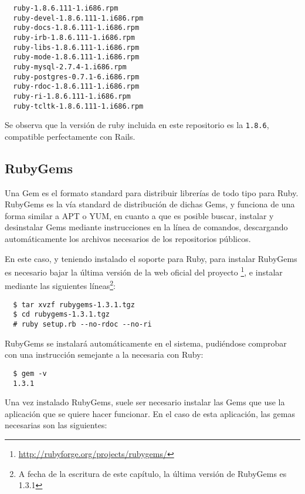 \begin{verbatim}
  ruby-1.8.6.111-1.i686.rpm
  ruby-devel-1.8.6.111-1.i686.rpm
  ruby-docs-1.8.6.111-1.i686.rpm
  ruby-irb-1.8.6.111-1.i686.rpm
  ruby-libs-1.8.6.111-1.i686.rpm
  ruby-mode-1.8.6.111-1.i686.rpm
  ruby-mysql-2.7.4-1.i686.rpm
  ruby-postgres-0.7.1-6.i686.rpm
  ruby-rdoc-1.8.6.111-1.i686.rpm
  ruby-ri-1.8.6.111-1.i686.rpm
  ruby-tcltk-1.8.6.111-1.i686.rpm
\end{verbatim}

Se observa que la versión de ruby incluida en este repositorio es la \texttt{1.8.6}, compatible perfectamente con Rails.



\subsection{RubyGems} %
\label{sub:rubygems}

Una Gem es el formato standard para distribuir librerías de todo tipo para Ruby. RubyGems es la vía standard de distribución de dichas Gems, y funciona de una forma similar a APT o YUM, en cuanto a que es posible buscar, instalar y desinstalar Gems mediante instrucciones en la línea de comandos, descargando automáticamente los archivos necesarios de los repositorios públicos.

En este caso, y teniendo instalado el soporte para Ruby, para instalar RubyGems es necesario bajar la última versión de la web oficial del proyecto \footnote{\url{http://rubyforge.org/projects/rubygems/}}, e instalar mediante las siguientes líneas\footnote{A fecha de la escritura de este capítulo, la última versión de RubyGems es 1.3.1}:

\begin{verbatim}
  $ tar xvzf rubygems-1.3.1.tgz
  $ cd rubygems-1.3.1.tgz
  # ruby setup.rb --no-rdoc --no-ri
\end{verbatim}

RubyGems se instalará automáticamente en el sistema, pudiéndose comprobar con una instrucción semejante a la necesaria con Ruby:

\begin{verbatim}
  $ gem -v
  1.3.1
\end{verbatim}

Una vez instalado RubyGems, suele ser necesario instalar las Gems que use la aplicación que se quiere hacer funcionar. En el caso de esta aplicación, las gemas necesarias son las siguientes:

